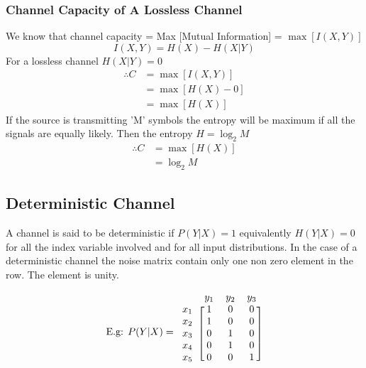 \documentclass[12pt]{article}
\begin{document}
\subsubsection{Channel Capacity of A Lossless Channel}
We know that channel capacity = Max [Mutual Information] = $\max [I(X,Y)]$ 
$$I(X,Y) = H(X) - H(X|Y)$$ 
For a lossless channel $H(X|Y) = 0$ 
\begin{align*}
\therefore C &= \max [I(X,Y)] \\
&= \max [H(X) - 0] \\
&= \max [H(X)]
\end{align*} 
If the source is transmitting 'M' symbols the entropy will be maximum if all the signals are equally likely. Then the entropy $H = \log_2 M$ 
\begin{align*}
\therefore C &= \max [H(X)] \\
&= \log_2 M
\end{align*} 

\subsection{Deterministic Channel}
A channel is said to be deterministic if $P(Y|X) = 1$ equivalently $H(Y|X) = 0$ for all the index variable involved and for all input distributions. 
In the case of a deterministic channel the noise matrix contain only one non zero element in the row. The element is unity.

\begin{minipage}{.3\linewidth}
$$\text{E.g: } P(Y|X) = \begin{blockarray}{cccc}
 & y_1 & y_2 & y_3 \\
\begin{block}{c[ccc]}
x_1 & 1 & 0 & 0 \\ 
x_2 & 1 & 0 & 0 \\ 
x_3 & 0 & 1 & 0 \\ 
x_4 & 0 & 1 & 0 \\ 
x_5 & 0 & 0 & 1 \\
\end{block}
\end{blockarray}$$
\end{minipage}%
\hfill
\begin{minipage}{.5\linewidth}
\centering
{}
\end{minipage}
\end{document}
